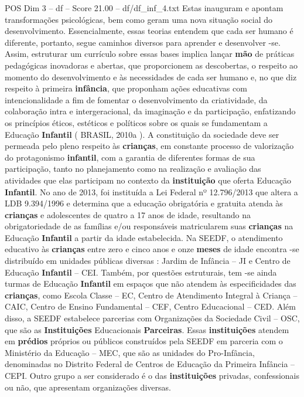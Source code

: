 \begin{textsample}{POS Dim 3 – df – Score 21.00 – df/df\_inf\_4.txt}
Estas inauguram e apontam transformações psicológicas, bem como geram uma nova situação social do desenvolvimento.
Essencialmente, essas teorias entendem que cada ser humano é diferente, portanto, segue caminhos diversos para aprender e desenvolver -se.
Assim, estruturar um currículo sobre essas bases implica lançar \textbf{mão} de práticas pedagógicas inovadoras e abertas, que proporcionem as descobertas, o respeito ao momento do desenvolvimento e às necessidades de cada ser humano e, no que diz respeito à primeira \textbf{infância}, que proponham ações educativas com intencionalidade a fim de fomentar o desenvolvimento da criatividade, da colaboração intra e intergeracional, da imaginação e da participação, enfatizando os princípios éticos, estéticos e políticos sobre os quais se fundamentam a Educação \textbf{Infantil} ( BRASIL, 2010a ).
A constituição da sociedade deve ser permeada pelo pleno respeito às \textbf{crianças}, em constante processo de valorização do protagonismo \textbf{infantil}, com a garantia de diferentes formas de sua participação, tanto no planejamento como na realização e avaliação das atividades que elas participam no contexto da \textbf{instituição} que oferta Educação \textbf{Infantil}.
No ano de 2013, foi instituída a Lei Federal nº 12.796/2013 que altera a LDB 9.394/1996 e determina que a educação obrigatória e gratuita atenda às \textbf{crianças} e adolescentes de quatro a 17 anos de idade, resultando na obrigatoriedade de as famílias e/ou responsáveis matricularem suas \textbf{crianças} na Educação \textbf{Infantil} a partir da idade estabelecida.
Na SEEDF, o atendimento educativo às \textbf{crianças} entre zero e cinco anos e onze \textbf{meses} de idade encontra -se distribuído em unidades públicas diversas : Jardim de Infância – JI e Centro de Educação \textbf{Infantil} – CEI.
Também, por questões estruturais, tem -se ainda turmas de Educação \textbf{Infantil} em espaços que não atendem às especificidades das \textbf{crianças}, como Escola Classe – EC, Centro de Atendimento Integral à Criança – CAIC, Centro de Ensino Fundamental – CEF, Centro Educacional – CED.
Além disso, a SEEDF estabelece parcerias com Organizações da Sociedade Civil – OSC, que são as \textbf{Instituições} Educacionais \textbf{Parceiras}.
Essas \textbf{instituições} atendem em \textbf{prédios} próprios ou públicos construídos pela SEEDF em parceria com o Ministério da Educação – MEC, que são as unidades do Pro-Infância, denominadas no Distrito Federal de Centros de Educação da Primeira Infância – CEPI.
Outro grupo a ser considerado é o das \textbf{instituições} privadas, confessionais ou não, que apresentam organizações diversas.

\end{textsample}
